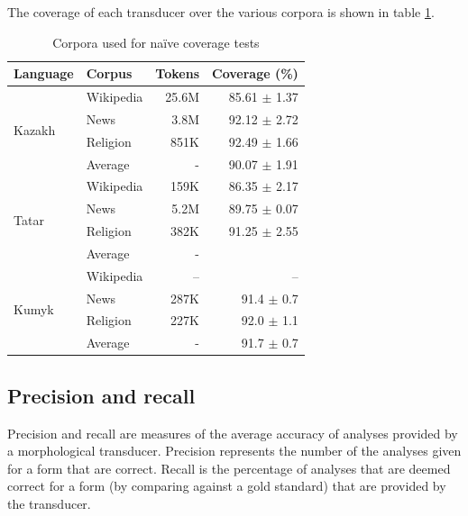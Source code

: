 \documentclass[a4paper,11pt,twocolumn]{article}
\begin{document}

The coverage of each transducer over the various corpora is shown in table \ref{table:corpora}.

\begin{table}
\begin{center}
\begin{tabular}{llrr}
\toprule
\textbf{Language} & \textbf{Corpus} & \textbf{Tokens} & \textbf{Coverage} (\%) \\
\midrule
\multirow{4}{*}{Kazakh} & Wikipedia & 25.6M & 85.61 $\pm$ 1.37 \\
	& News & 3.8M & 92.12 $\pm$ 2.72  \\
	& Religion & 851K & 92.49 $\pm$ 1.66 \\\cline{2-4}
	& Average & - & 90.07 $\pm$ 1.91 \\
\midrule
\multirow{4}{*}{Tatar} & Wikipedia & 159K & 86.35 $\pm$ 2.17 \\
	& News & 5.2M & 89.75 $\pm$ 0.07 \\
	& Religion & 382K & 91.25 $\pm$ 2.55 \\\cline{2-4}
	& Average & - &  \\
\midrule
\multirow{4}{*}{Kumyk} & Wikipedia & -- & -- \\
        & News & 287K &  91.4 $\pm$ 0.7 \\
	& Religion & 227K & 92.0 $\pm$ 1.1 \\\cline{2-4}
	& Average & - & 91.7 $\pm$ 0.7 \\
\bottomrule
\end{tabular}
 \caption{Corpora used for naïve coverage tests}
 \label{table:corpora}
\end{center}
\end{table}

\subsection{Precision and recall}

Precision and recall are measures of the average accuracy of analyses provided by a morphological transducer.  Precision represents the number of the analyses given for a form that are correct.  Recall is the percentage of analyses that are deemed correct for a form (by comparing against a gold standard) that are provided by the transducer.
\end{document}
